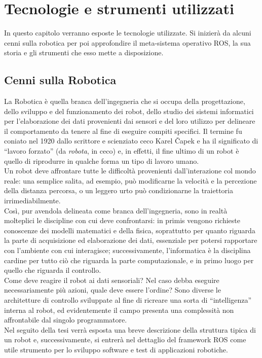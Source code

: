 \chapter{Tecnologie e strumenti utilizzati}\label{cap:ROS}
In questo capitolo verranno esposte le tecnologie utilizzate. Si inizierà da alcuni cenni sulla robotica per poi approfondire il meta-sistema operativo ROS, la sua storia e gli strumenti che esso mette a disposizione.
\section{Cenni sulla Robotica}

La Robotica è quella branca dell’ingegneria che si occupa della progettazione, dello sviluppo e del funzionamento dei robot, dello studio dei sistemi informatici per l’elaborazione dei dati provenienti dai sensori e del loro utilizzo per delineare il comportamento da tenere al fine di eseguire compiti specifici. Il termine fu coniato nel 1920 dallo scrittore e scienziato ceco Karel Čapek e ha il significato di ``lavoro forzato'' (da \textit{robota}, in ceco) e, in effetti, il fine ultimo di un robot è quello di riprodurre in qualche forma un tipo di lavoro umano.\\ 
Un robot deve affrontare tutte le difficoltà provenienti dall’interazione col mondo reale: una semplice salita, ad esempio, può modificarne la velocità e la percezione della distanza percorsa, o un leggero urto può condizionarne la traiettoria irrimediabilmente.\\
Così, pur avendola delineata come branca dell’ingegneria, sono in realtà molteplici le discipline con cui deve confrontarsi: in primis vengono richieste conoscenze dei modelli matematici e della fisica, soprattutto per quanto riguarda la parte di acquisizione ed elaborazione dei dati, essenziale per potersi rapportare con l’ambiente con cui interagisce; successivamente, l’informatica è la disciplina cardine per tutto ciò che riguarda la parte computazionale, e in primo luogo per quello che riguarda il controllo.\\
Come deve reagire il robot ai dati sensoriali? Nel caso debba eseguire necessariamente più azioni, quale deve essere l’ordine? Sono diverse le architetture di controllo sviluppate al fine di ricreare una sorta di ``intelligenza'' interna al robot, ed evidentemente il campo presenta una complessità non affrontabile dal singolo programmatore.\\
Nel seguito della tesi verrà esposta una breve descrizione della struttura tipica di un robot e, successivamente, si entrerà nel dettaglio del framework ROS come utile strumento per lo sviluppo software e test di applicazioni robotiche.

